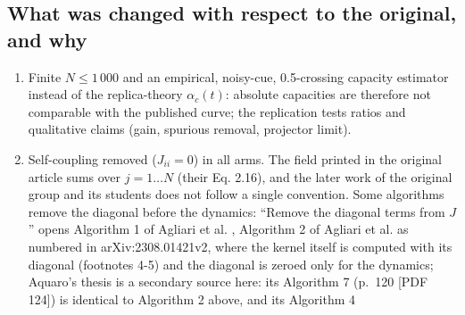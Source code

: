 \subsection{What was changed with respect to the original, and
why}\label{what-was-changed-with-respect-to-the-original-and-why}

\begin{enumerate}
\def\labelenumi{\arabic{enumi}.}
\tightlist
\item
  Finite \(N \le 1\,000\) and an empirical, noisy-cue, 0.5-crossing
  capacity estimator instead of the replica-theory \(\alpha_c(t)\):
  absolute capacities are therefore not comparable with the published
  curve; the replication tests ratios and qualitative claims (gain,
  spurious removal, projector limit).
\item
  Self-coupling removed (\(J_{ii} = 0\)) in all arms. The field printed
  in the original article sums over \(j = 1 \dots N\) (their Eq. 2.16),
  and the later work of the original group and its students does not
  follow a single convention. Some algorithms remove the diagonal before
  the dynamics: ``Remove the diagonal terms from \(J\)'' opens Algorithm
  1 of Agliari et al. \supercite{agliari2024hebbian}, Algorithm 2 of
  Agliari et al. \supercite{agliari2024regularization} as numbered in
  arXiv:2308.01421v2, where the kernel itself is computed with its
  diagonal (footnotes 4-5) and the diagonal is zeroed only for the
  dynamics; Aquaro's thesis \supercite{aquaro2025thesis} is a secondary
  source here: its Algorithm 7 (p.~120 {[}PDF 124{]}) is identical to
  Algorithm 2 above, and its Algorithm 4


\end{enumerate}
